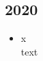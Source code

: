 \subsection*{2020}
\begin{history}


    \begin{itemize}

        \item x\\
              text

    \end{itemize}

\end{history}
